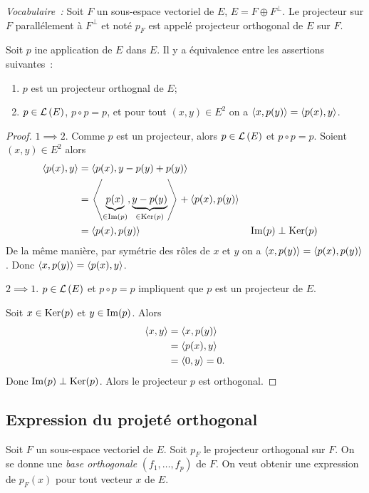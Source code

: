 \emph{Vocabulaire~:} Soit \(F\) un sous-espace vectoriel de \(E\), \(E = F \oplus F^\perp\). Le projecteur sur \(F\) parallélement à \(F^\perp\) et noté \(p_F\) est appelé projecteur orthogonal de \(E\) sur \(F\).

\begin{theo}
  Soit \(p\) ine application de \(E\) dans \(E\). Il y a équivalence entre les assertions suivantes~:
  \begin{enumerate}
  \item \(p\) est un projecteur orthognal de \(E\);
  \item \(p \in \mathcal{L}\left(E\right)\), \(p \circ p =p\), et pour tout \((x,y) \in E^2\) on a \(\left\langle{x},{p(y)}\right\rangle=\left\langle{p(x)},{y}\right\rangle\).
  \end{enumerate}
\end{theo}
\begin{proof}
  \(1 \implies 2\). Comme \(p\) est un projecteur, alors \(p \in \mathcal{L}\left(E\right)\) et \(p \circ p =p\). Soient \((x,y) \in E^2\) alors
  \begin{align}
    \left\langle{p(x)},{y}\right\rangle &=  \left\langle{p(x)},{y-p(y)+p(y)}\right\rangle \\
    &= \left\langle{\underbrace{p(x)}_{\in \operatorname{Im}(p)}},{\underbrace{y-p(y)}_{\in \operatorname{Ker}(p)}}\right\rangle+\left\langle{p(x)},{p(y)}\right\rangle \\
    &=  \left\langle{p(x)},{p(y)}\right\rangle && \operatorname{Im}(p) \perp \operatorname{Ker}(p)
  \end{align}
  De la même manière, par symétrie des rôles de \(x\) et \(y\) on a \(\left\langle{x},{p(y)}\right\rangle=\left\langle{p(x)},{p(y)}\right\rangle\). Donc \(\left\langle{x},{p(y)}\right\rangle=\left\langle{p(x)},{y}\right\rangle\).

  \(2 \implies 1\). \(p \in \mathcal{L}\left(E\right)\) et \(p \circ p =p\) impliquent que \(p\) est un projecteur de \(E\).

  Soit \(x \in \operatorname{Ker}(p)\) et \(y \in \operatorname{Im}(p)\). Alors
  \begin{align}
    \left\langle{x},{y}\right\rangle &= \left\langle{x},{p(y)}\right\rangle \\
    &=\left\langle{p(x)},{y}\right\rangle \\
    &=\left\langle{0},{y}\right\rangle=0.
  \end{align}
  Donc \(\operatorname{Im}(p) \perp \operatorname{Ker}(p)\). Alors le projecteur \(p\) est orthogonal.
\end{proof}

\subsection{Expression du projeté orthogonal}

Soit \(F\) un sous-espace vectoriel de \(E\). Soit \(p_F\) le projecteur orthogonal sur \(F\). On se donne une \emph{base orthogonale} \((f_1, \ldots, f_p)\) de \(F\). On veut obtenir une expression de \(p_F(x)\) pour tout vecteur \(x\) de \(E\).

